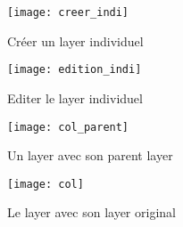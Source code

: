 \begin{figure}[H]
\centering
\texttt{[image: creer\_indi]}
\caption{Créer un layer individuel}
\end{figure}

\begin{figure}[H]
\centering
\texttt{[image: edition\_indi]}
\caption{Editer le layer individuel}
\end{figure}

\begin{figure}[H]
\centering
\texttt{[image: col\_parent]}
\caption{Un layer avec son parent layer}
\end{figure}

\begin{figure}[H]
\centering
\texttt{[image: col]}
\caption{Le layer avec son layer original}
\end{figure}